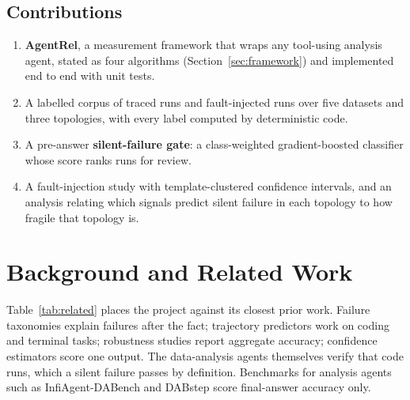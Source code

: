 \documentclass[10pt,twocolumn]{article}
\begin{document}
\subsection{Contributions}
\begin{enumerate}
  \item \textbf{AgentRel}, a measurement framework that wraps any tool-using analysis agent, stated as four
    algorithms (Section~\ref{sec:framework}) and implemented end to end with \nTests{} unit tests.
  \item A labelled corpus of \nRuns{} traced runs and \nFaultRuns{} fault-injected runs over five datasets and
    three topologies, with every label computed by deterministic code.
  \item A pre-answer \textcolor{sfred}{\textbf{silent-failure gate}}: a class-weighted gradient-boosted
    classifier \cite{lightgbm} whose score ranks runs for review.
  \item A fault-injection study with template-clustered confidence intervals, and an analysis relating which
    signals predict silent failure in each topology to how fragile that topology is.
\end{enumerate}

\section{Background and Related Work}
Table~\ref{tab:related} places the project against its closest prior work. Failure taxonomies explain failures
after the fact; trajectory predictors work on coding and terminal tasks; robustness studies report aggregate accuracy;
confidence estimators score one output. The data-analysis agents themselves verify that code runs, which a silent
failure passes by definition. Benchmarks for analysis agents such as InfiAgent-DABench \cite{infiagent} and
DABstep \cite{dabstep} score final-answer accuracy only.
\end{document}
